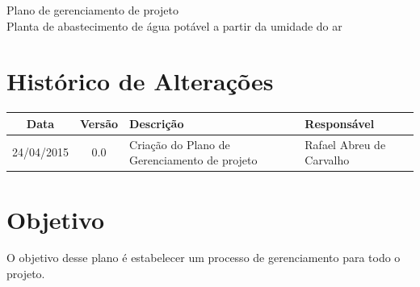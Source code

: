 % 
% 
% 
% 
\begin{center}
 {\large Plano de gerenciamento de projeto}\\[0.2cm]
 {Planta de abastecimento de água potável a partir da umidade do ar}\\
 \end{center}
 
 \section*{Histórico de Alterações}
\begin{table}[h]
\centering
\begin{tabular}{|c|c|p{6cm}|p{5cm}|}

Data & Versão & Descrição & Responsável\\
\hline                               
24/04/2015 & 0.0 & Criação do Plano de Gerenciamento de projeto & Rafael Abreu de Carvalho\\
\hline

\end{tabular}
\end{table}

\section*{Objetivo}
  O objetivo desse plano é estabelecer um processo de gerenciamento para todo o projeto.
  
